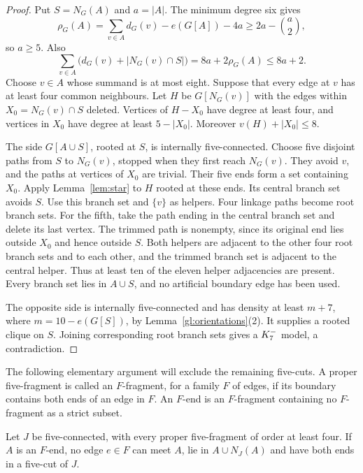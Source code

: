 \begin{proof}
Put $S=N_G(A)$ and $a=|A|$. The minimum degree six gives
\[
 \rho_G(A)=\sum_{v\in A}d_G(v)-e(G[A])-4a
 \geq2a-\binom a2,
\]
so $a\geq5$. Also
\[
 \sum_{v\in A}\bigl(d_G(v)+|N_G(v)\cap S|\bigr)
 =8a+2\rho_G(A)\leq8a+2.
\]
Choose $v\in A$ whose summand is at most eight. Suppose that every
edge at $v$ has at least four common neighbours. Let $H$ be
$G[N_G(v)]$ with the edges within $X_0=N_G(v)\cap S$ deleted.
Vertices of $H-X_0$ have degree at least four, and vertices in
$X_0$ have degree at least $5-|X_0|$. Moreover
$v(H)+|X_0|\leq8$.

The side $G[A\cup S]$, rooted at $S$, is internally five-connected.
Choose five disjoint paths from $S$ to $N_G(v)$, stopped when they
first reach $N_G(v)$. They avoid $v$, and the paths at vertices
of $X_0$ are trivial.
Their five ends form a set containing $X_0$. Apply
Lemma~\ref{lem:star} to $H$ rooted at these ends. Its central branch
set avoids $S$. Use this branch set and $\{v\}$ as helpers. Four
linkage paths become root branch sets. For the fifth, take the path
ending in the central branch set and delete its last vertex. The
trimmed path is nonempty, since its original end lies outside $X_0$
and hence outside $S$.
Both helpers are adjacent to the other four root branch sets and to
each other, and the trimmed branch set is adjacent to the central
helper. Thus at least ten of the eleven helper adjacencies are present.
Every branch set lies in $A\cup S$, and no artificial boundary edge
has been used.

The opposite side is internally five-connected and has density
at least $m+7$, where $m=10-e(G[S])$, by
Lemma~\ref{gl:orientations}(2). It supplies a rooted clique on $S$.
Joining corresponding root branch sets gives a $K_7^{-}$ model,
a contradiction.
\end{proof}

The following elementary argument will exclude the remaining
five-cuts. A proper five-fragment is called an $F$-fragment, for a
family $F$ of edges, if its boundary contains both ends of an edge
in $F$. An $F$-end is an $F$-fragment containing no $F$-fragment as
a strict subset.

\begin{lemma}\label{gl:end}
Let $J$ be five-connected, with every proper five-fragment of order
at least four. If $A$ is an $F$-end, no edge $e\in F$ can meet $A$,
lie in $A\cup N_J(A)$ and have both ends in a five-cut of $J$.
\end{lemma}

